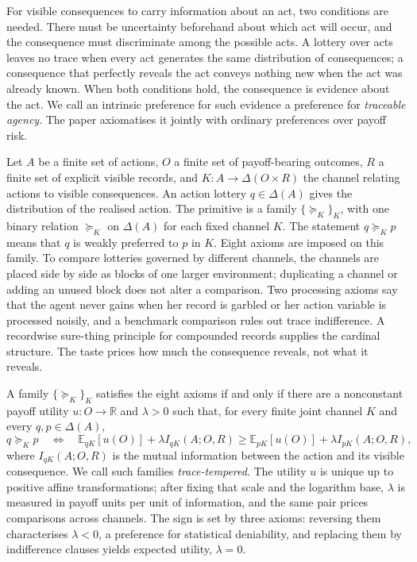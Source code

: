 \documentclass[11pt,a4paper]{article}
\theoremstyle{definition}
\newcommand{\E}{\mathbb E}
\newcommand{\1}{\mathbf 1}
\begin{document}
For visible consequences to carry information about an act, two conditions are needed.  There must be uncertainty
beforehand about which act will occur, and the consequence must discriminate among the
possible acts.  A lottery over acts leaves no trace when every act generates the same distribution of
consequences; a consequence that perfectly reveals the act conveys nothing new when the act was already
known.  When both conditions hold, the consequence is evidence about the act.  We call an intrinsic
preference for such evidence a preference for \emph{traceable agency}.  The paper axiomatises it jointly
with ordinary preferences over payoff risk.

Let $A$ be a finite set of actions, $O$ a finite set of payoff-bearing
outcomes, $R$ a finite set of explicit visible records, and $K:A\to\Delta(O\times R)$ the channel relating actions to
visible consequences.  An action lottery $q\in\Delta(A)$ gives the distribution of the realised action.  The primitive is a family
$\{\succeq_K\}_K$, with one binary relation $\succeq_K$ on $\Delta(A)$ for each fixed channel $K$.
The statement $q\succeq_Kp$ means that $q$ is weakly preferred to $p$ in $K$.  Eight axioms are
imposed on this family.  To compare lotteries governed
by different channels, the channels are placed side by side as blocks of one larger environment; duplicating a
channel or adding an unused block does not alter a comparison.  Two processing axioms say that the agent never gains when her record is garbled or her action variable is processed noisily, and a benchmark comparison rules out trace indifference. A recordwise sure-thing principle for compounded records supplies
the cardinal structure.  The taste prices how much the consequence reveals, not what it reveals.

A family $\{\succeq_K\}_K$ satisfies the eight axioms if and
only if there are a nonconstant payoff utility $u:O\to\mathbb R$ and $\lambda>0$ such that, for every finite joint
channel $K$ and every $q,p\in\Delta(A)$,
\[
 q\succeq_Kp
 \quad\Longleftrightarrow\quad
 \E_{qK}[u(O)]+\lambda I_{qK}(A;O,R)
 \ge
 \E_{pK}[u(O)]+\lambda I_{pK}(A;O,R),
\]
where $I_{qK}(A;O,R)$ is the mutual information between the action and its visible consequence.  We call such
families \emph{trace-tempered}.  The utility $u$ is unique up to positive affine transformations; after fixing that
scale and the logarithm base, $\lambda$ is measured in payoff units per unit of information, and the same pair prices comparisons across channels.  The sign is set by three axioms: reversing them characterises $\lambda<0$, a preference for statistical
deniability, and replacing them by indifference clauses yields expected utility, $\lambda=0$.
\end{document}
